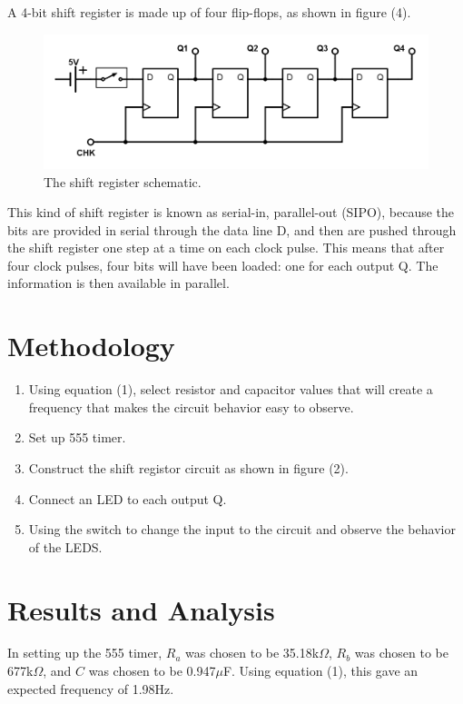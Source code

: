 \documentclass[twocolumn, amsmath]{revtex4}
\begin{document}
A 4-bit shift register is made up of four flip-flops, as shown in figure (4). 

\begin{figure}[h]
    \includegraphics[scale=0.26]{bitshifter.png}  
    \caption{The shift register schematic.}
\end{figure}

This kind of shift register is known as serial-in, parallel-out (SIPO), because the bits are provided in serial through the data line D, and then are pushed through the shift register one step at a time on each clock pulse. 
This means that after four clock pulses, four bits will have been loaded: one for each output Q. The information is then available in parallel.


\section{Methodology}

\begin{enumerate}
	\item Using equation (1), select resistor and capacitor values that will create a frequency that makes the circuit behavior easy to observe.
	\item Set up 555 timer.
    \item Construct the shift registor circuit as shown in figure (2). 
    \item Connect an LED to each output Q.
    \item Using the switch to change the input to the circuit and observe the behavior of the LEDS.
\end{enumerate}


\section{Results and Analysis}
In setting up the 555 timer, $R_a$ was chosen to be 35.18k$\Omega$, $R_b$ was chosen to be 677k$\Omega$, and $C$ was chosen to be 0.947$\mu$F. Using equation (1), this gave an expected frequency of 1.98Hz.
\end{document}

